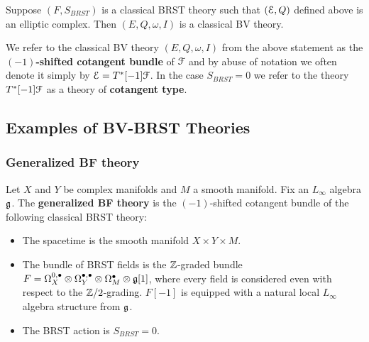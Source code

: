 \documentclass[10pt, oneside]{article}
\begin{document}
\begin{lemma}
Suppose $(F, S_{BRST})$ is a classical BRST theory such that $(\mathcal E, Q)$ defined above is an elliptic complex. Then $(E, Q, \omega, I)$ is a classical BV theory.
\end{lemma}

We refer to the classical BV theory $(E, Q, \omega, I)$ from the above statement as the {\bf $(-1)$-shifted cotangent bundle} of $\mathcal F$ and by abuse of notation we often denote it simply by $\mathcal E = T^*[-1] \mathcal F$. In the case $S_{BRST} = 0$ we refer to the theory $T^*[-1] \mathcal F$ as a theory of {\bf cotangent type}.

\subsection{Examples of BV-BRST Theories}

\begin{comment}
\brian{should we make these definitions, recollections, or just conventions?}

If $M$ is a smooth manifold, its {\em de Rham stack}, as a dg ringed space, is 
\[
M_{\rm dR} = \left(M , (\Omega^\bu_M, \d_{\rm dR})\right) .
\] 

If $X$ is a complex manifold, there are two naturally associated dg ringed spaces that will be important for us. 
The first is the $\dbar$-{\em stack}, defined by
\[
X_{\dbar} = \left(M , (\Omega^{0,\bu}_X, \dbar) \right) .
\]
The next is the {\em Dolbeault stack}, defined by
\[
X_{\rm Dol} = \left(M, (\Omega^{\bu,\bu}_X, \dbar)\right) .
\] 
Note that as sheaves of dg modules, there is a quasi-isomorphism $(\Omega^{p,*}_M, \dbar) = \Omega^{p, hol}_M$.
Thus, one can think of the underlying ring of the Dolbeault stack as functions on the shifted holomorphic tangent bundle $T^{1,0} [1] M$ of $M$.
\end{comment}

\subsubsection{Generalized BF theory}

\begin{definition}
Let $X$ and $Y$ be complex manifolds and $M$ a smooth manifold. Fix an $L_\infty$ algebra $\mathfrak g$. The {\bf generalized BF theory} is the $(-1)$-shifted cotangent bundle of the following classical BRST theory:
\begin{itemize}
\item The spacetime is the smooth manifold $X\times Y\times M$.

\item The bundle of BRST fields is the $\mathbb Z$-graded bundle $F = \Omega^{0,\bullet}_X \otimes \Omega^{\bullet,\bullet}_Y \otimes \Omega^\bullet_M \otimes \mathfrak g[1]$, where every field is considered even with respect to the $\mathbb Z/2$-grading. $F[-1]$ is equipped with a natural local $L_\infty$ algebra structure from $\mathfrak g$.

\item The BRST action is $S_{BRST} = 0$.
\end{itemize}
\end{definition}
\end{document}
